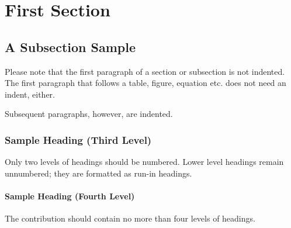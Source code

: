 \documentclass[runningheads]{llncs}
\begin{document}
\section{First Section}
\subsection{A Subsection Sample}

Please note that the first paragraph of a section or subsection is not indented. The first paragraph that follows a table, figure, equation etc. does not need an indent, either.

Subsequent paragraphs, however, are indented.

\subsubsection{Sample Heading (Third Level)}

Only two levels of headings should be numbered. Lower level headings remain unnumbered; they are formatted as run-in headings.

\paragraph{Sample Heading (Fourth Level)}

The contribution should contain no more than four levels of headings. \cite{LiteratureSurveyOnOpenPlatformCommunications}



\end{document}
